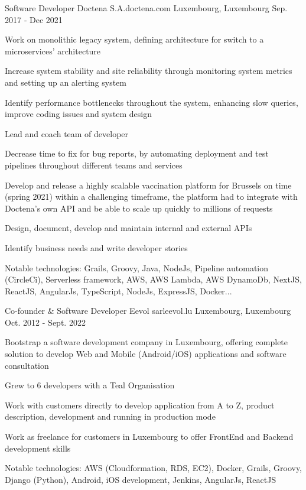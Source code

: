 \begin{cventries}
  \cventry
    {Software Developer} %
    {Doctena S.A.{\enskip\cdotp\enskip}doctena.com} %
    {Luxembourg, Luxembourg} %
    {Sep. 2017 ‑ Dec 2021} %
    {
      \begin{cvitems} %
        \item {Work on monolithic legacy system, defining architecture for switch to a microservices’ architecture}
        \item {Increase system stability and site reliability through monitoring system metrics and setting up an alerting system}
        \item {Identify performance bottlenecks throughout the system, enhancing slow queries, improve coding issues and system design}
        \item {Lead and coach team of developer}
        \item {Decrease time to fix for bug reports, by automating deployment and test pipelines throughout different teams and services}
        \item {Develop and release a highly scalable vaccination platform for Brussels on time (spring 2021) within a challenging timeframe, the platform had to integrate with Doctena’s own API and be able to scale up quickly to millions of requests}
        \item {Design, document, develop and maintain internal and external APIs}
        \item {Identify business needs and write developer stories}
        \item {Notable technologies: Grails, Groovy, Java, NodeJs, Pipeline automation (CircleCi), Serverless framework, AWS, AWS Lambda, AWS DynamoDb,
NextJS, ReactJS, AngularJs, TypeScript, NodeJs, ExpressJS, Docker...}
        \end{cvitems}
    }

  \cventry
    {Co-founder \& Software Developer} %
    {Eevol sarl{\enskip\cdotp\enskip}eevol.lu} %
    {Luxembourg, Luxembourg} %
    {Oct. 2012 - Sept. 2022} %
    {
      \begin{cvitems} %
        \item {Bootstrap a software development company in Luxembourg, offering complete solution to develop Web and Mobile (Android/iOS) applications and software consultation}
        \item {Grew to 6 developers with a Teal Organisation}
        \item {Work with customers directly to develop application from A to Z, product description, development and running in production mode}
        \item {Work as freelance for customers in Luxembourg to offer FrontEnd and Backend development skills}
        \item {Notable technologies: AWS (Cloudformation, RDS, EC2), Docker, Grails, Groovy, Django (Python), Android, iOS development, Jenkins, AngularJs, ReactJS}
      \end{cvitems}
    }


\end{cventries}
